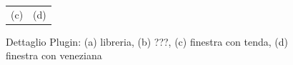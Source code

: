 \begin{figure}[htbp]
\begin{center}
\begin{tabular}{c @{\hspace{1em}} c}
 (c) & (d) \\
\end{tabular}
\end{center}
\caption{Dettaglio Plugin: (a) libreria, (b) ???, (c) finestra con tenda, (d) finestra con veneziana}\label{fig:figura4}
\end{figure}

\newpage
